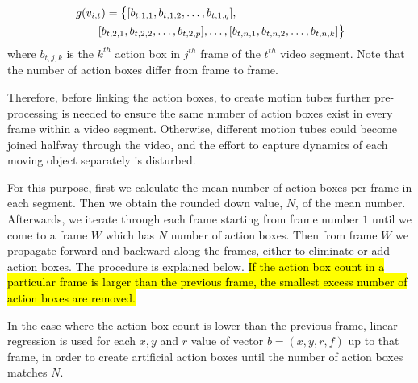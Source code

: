 \begin{equation}
\label{eqn:action box}
\begin{split}
\MoveEqLeft
 g(v_{i,t}) = \big\{[b_{t,1,1},b_{t,1,2},\dots,b_{t,1,q}],\\
 & [b_{t,2,1},b_{t,2,2},\dots,b_{t,2,p}],\dots,[b_{t,n,1},b_{t,n,2},\dots,b_{t,n,k}]\big\}
\end{split}
\end{equation}
where $b_{t,j,k}$ is the $k^{th}$ action box in $j^{th}$ frame of the $t^{th}$ video segment. Note that the number of
action boxes differ from frame to frame.

Therefore, before linking the action boxes, to create motion tubes further pre-processing is needed to ensure the same number of action
boxes exist in every frame within a video segment. Otherwise, different motion tubes could become joined halfway through the video, and the
effort to capture dynamics of each moving object separately is disturbed.

For this purpose, first we calculate the mean number of action boxes per frame in each segment. Then we obtain the rounded down value, $N$, of the mean number. Afterwards, we iterate through each frame starting from frame number $1$ until we come to a frame $W$ which has $N$ number of action boxes. Then from frame $W$ we propagate forward and backward along the frames, either to eliminate or add action boxes. The procedure is explained below. \hl{If the action box count in a particular frame is larger than the previous frame, the smallest excess number of action boxes are removed.} %

In the case where the action box count is lower than the previous frame, linear regression %
is used for each $x,y$ and $r$ value of vector $b = (x,y,r,f)$
up to that frame, in order to create artificial action boxes until the number of action boxes matches $N$.




